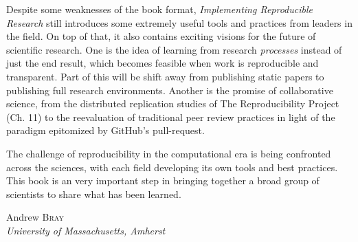 \documentclass[12pt]{article}
\newenvironment{references}{
  \begin{center} \textsf{REFERENCES} \end{center}
  \begin{list}{}{\topsep=0pt\parsep=0pt\baselineskip=20pt
   \leftmargin=1.5em\itemindent=-\leftmargin}}
  {\end{list}}
\begin{document}
Despite some weaknesses of the book format, \emph{Implementing Reproducible
Research} still introduces some extremely useful tools and practices from leaders in 
the field.  On top of that, it also contains exciting visions for the future of scientific research.
One is the idea of learning from research \emph{processes} instead of just the 
end result, which becomes feasible when work is reproducible and transparent.
Part of this will be shift away from publishing static papers to publishing full research
environments.  Another is the promise of collaborative science, from the distributed
replication studies of The Reproducibility Project (Ch. 11) to the reevaluation of traditional 
peer review practices in light of the paradigm epitomized by GitHub's pull-request.

The challenge of reproducibility in the computational era is being confronted 
across the sciences, with each field developing its own tools and best practices.
This book is an very important step in bringing together a broad group of scientists
to share what has been learned.



\begin{flushright}\def\baselinestretch{1}
Andrew \textsc{Bray}\\
\emph{University of Massachusetts, Amherst}

\end{flushright}


%
\end{document}
